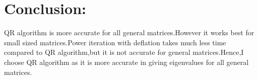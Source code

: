 \documentclass[journal]{IEEEtran}
\begin{document}
\section*{Conclusion:}
QR algorithm is more accurate for all general matrices.However it works best for small sized matrices.Power iteration with deflation takes much less time compared to QR algorithm,but it is not accurate for general matrices.Hence,I choose QR algorithm as it is more accurate in giving eigenvalues for all general matrices.
\end{document}
